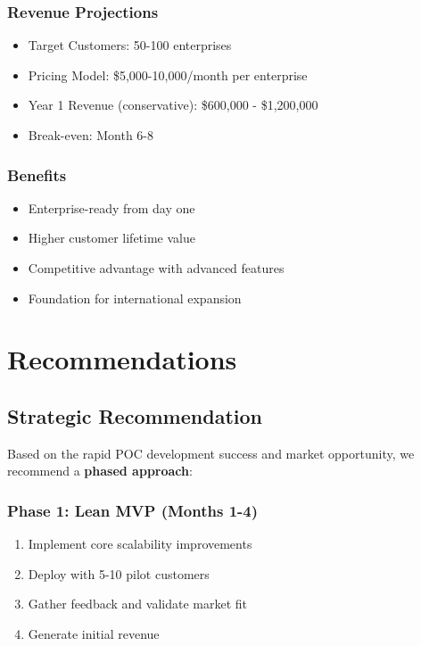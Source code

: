 \documentclass[12pt,a4paper]{report}
\begin{document}
\subsection{Revenue Projections}
\begin{itemize}
    \item Target Customers: 50-100 enterprises
    \item Pricing Model: \$5,000-10,000/month per enterprise
    \item Year 1 Revenue (conservative): \$600,000 - \$1,200,000
    \item Break-even: Month 6-8
\end{itemize}

\subsection{Benefits}
\begin{itemize}
    \item Enterprise-ready from day one
    \item Higher customer lifetime value
    \item Competitive advantage with advanced features
    \item Foundation for international expansion
\end{itemize}

\chapter{Recommendations}

\section{Strategic Recommendation}

Based on the rapid POC development success and market opportunity, we recommend a \textbf{phased approach}:

\subsection{Phase 1: Lean MVP (Months 1-4)}
\begin{enumerate}
    \item Implement core scalability improvements
    \item Deploy with 5-10 pilot customers
    \item Gather feedback and validate market fit
    \item Generate initial revenue
\end{enumerate}
\end{document}
